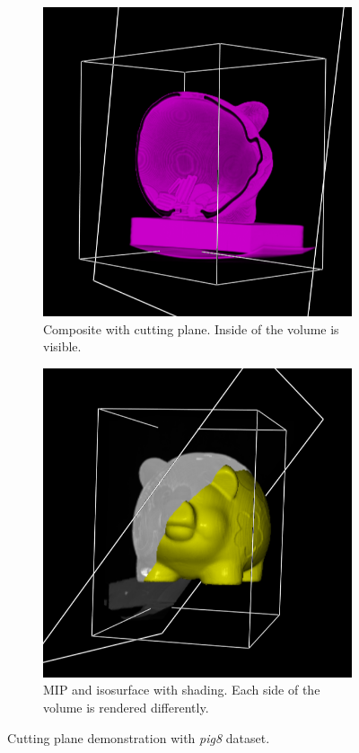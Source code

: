 \documentclass[a4paper]{article}
\begin{document}
\begin{figure}[h]
  \centering
  \begin{subfigure}[b]{0.45\textwidth}
    \centering
    \includegraphics[width=\textwidth]{pig8-cut-plane-coins}
    \caption{Composite with cutting plane. Inside of the volume is visible.}
  \end{subfigure}
  \hfill
  \begin{subfigure}[b]{0.45\textwidth}
    \centering
    \includegraphics[width=\textwidth]{pig8-cut-plane-renders}
    \caption{MIP and isosurface with shading. Each side of the volume is rendered differently.}
  \end{subfigure}
  \caption{Cutting plane demonstration with \textit{pig8} dataset.}
  \label{fig:cutplane}
\end{figure}
\end{document}
